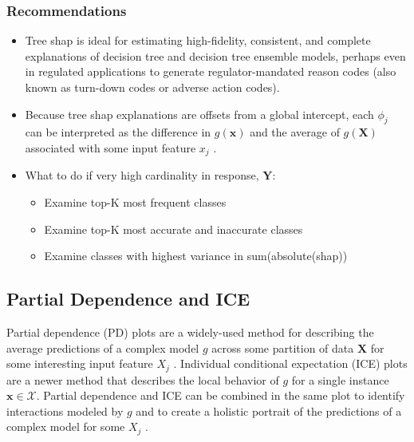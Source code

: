 \documentclass{article}
\begin{document}
\subsubsection{Recommendations}

\begin{itemize}
	
	\item Tree shap is ideal for estimating high-fidelity, consistent, and complete explanations of decision tree and decision tree ensemble models, perhaps even in regulated applications to generate regulator-mandated reason codes (also known as turn-down codes or adverse action codes).
	
	\item Because tree shap explanations are offsets from a global intercept, each $\phi_j$ can be interpreted as the difference in $g(\mathbf{x})$ and the average of $g(\mathbf{X})$ associated with some input feature $x_j$ \cite{molnar}. 

\item What to do if very high cardinality in response, $\mathbf{Y}$:

\begin{itemize}

  \item Examine top-K most frequent classes
  \item Examine top-K most accurate and inaccurate classes
  \item Examine classes with highest variance in sum(absolute(shap))

\end{itemize}

\end{itemize}


\subsection{Partial Dependence and ICE}

Partial dependence (PD) plots are a widely-used method for describing the average predictions of a complex model $g$ across some partition of data $\mathbf{X}$ for some interesting input feature $X_j$ \cite{esl}. Individual conditional expectation (ICE) plots are a newer method that describes the local behavior of $g$ for a single instance $\mathbf{x} \in \mathcal{X}$. Partial dependence and ICE can be combined in the same plot to identify interactions modeled by $g$ and to create a holistic portrait of the predictions of a complex model for some $X_j$  \cite{ice_plots}.
	
\end{document}

